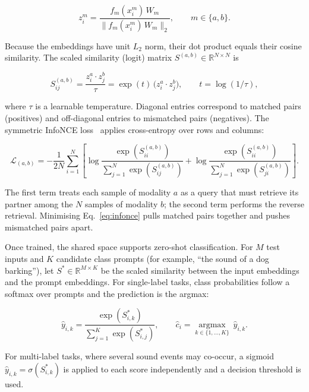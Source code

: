 \documentclass[pdflatex,sn-mathphys-num]{sn-jnl}%
\theoremstyle{thmstyleone}%
\theoremstyle{thmstyletwo}%
\theoremstyle{thmstylethree}%
\begin{document}
\begin{equation}
z^{m}_i = \frac{f_m(x^{m}_i)\,W_m}{\lVert f_m(x^{m}_i)\,W_m \rVert_2}, \qquad m \in \{a,b\}.
\label{eq:embed}
\end{equation}

Because the embeddings have unit $L_2$ norm, their dot product equals their cosine similarity. The scaled similarity (logit) matrix $S^{(a,b)} \in \mathbb{R}^{N\times N}$ is

\begin{equation}
S^{(a,b)}_{ij} = \frac{z^{a}_i \cdot z^{b}_j}{\tau} = \exp(t)\,\big(z^{a}_i \cdot z^{b}_j\big), \qquad t = \log(1/\tau),
\label{eq:logits}
\end{equation}

where $\tau$ is a learnable temperature. Diagonal entries correspond to matched pairs (positives) and off-diagonal entries to mismatched pairs (negatives). The symmetric InfoNCE loss~\cite{oord2018cpc,sohn2016npair} applies cross-entropy over rows and columns:

\begin{equation}
\mathcal{L}_{(a,b)} = -\frac{1}{2N}\sum_{i=1}^{N}\left[
\log\frac{\exp(S^{(a,b)}_{ii})}{\sum_{j=1}^{N}\exp(S^{(a,b)}_{ij})}
+
\log\frac{\exp(S^{(a,b)}_{ii})}{\sum_{j=1}^{N}\exp(S^{(a,b)}_{ji})}
\right].
\label{eq:infonce}
\end{equation}

The first term treats each sample of modality $a$ as a query that must retrieve its partner among the $N$ samples of modality $b$; the second term performs the reverse retrieval. Minimising Eq.~\eqref{eq:infonce} pulls matched pairs together and pushes mismatched pairs apart.

Once trained, the shared space supports zero-shot classification. For $M$ test inputs and $K$ candidate class prompts (for example, ``the sound of a dog barking''), let $S^{*} \in \mathbb{R}^{M\times K}$ be the scaled similarity between the input embeddings and the prompt embeddings. For single-label tasks, class probabilities follow a softmax over prompts and the prediction is the argmax:

\begin{equation}
\hat{y}_{i,k} = \frac{\exp(S^{*}_{i,k})}{\sum_{j=1}^{K}\exp(S^{*}_{i,j})}, \qquad
\hat{c}_i = \underset{k \in \{1,\ldots,K\}}{\operatorname{argmax}}\ \hat{y}_{i,k}.
\label{eq:zeroshot}
\end{equation}

For multi-label tasks, where several sound events may co-occur, a sigmoid $\hat{y}_{i,k} = \sigma(S^{*}_{i,k})$ is applied to each score independently and a decision threshold is used.
\end{document}

